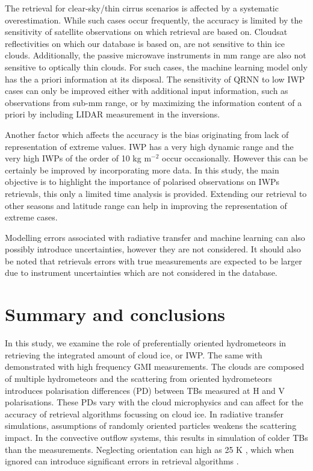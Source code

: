 \documentclass[amt, manuscript]{copernicus}
\begin{document}
The retrieval for clear-sky/thin cirrus scenarios is affected by a systematic overestimation. While such cases occur frequently, the accuracy is limited by the sensitivity of satellite observations on which retrieval are based on. Cloudsat reflectivities on which our database is based on, are not sensitive to thin ice clouds. Additionally, the passive microwave instruments in mm range are also not sensitive to optically thin clouds. For such cases, the machine learning model only has the a priori information at its disposal. The sensitivity of QRNN to low IWP cases can only be improved either with additional input information, such as observations from sub-mm range, or by maximizing the information content of a priori by including LIDAR measurement in the inversions.

Another factor which affects the accuracy is the bias originating from lack of representation of extreme values. IWP has a very high dynamic range and the very high IWPs of the order of 10\,\,kg m$^{-2}$ occur occasionally. However this can be certainly be improved by incorporating more data. In this study, the main objective is to highlight the importance of polarised observations on IWPs retrievals, this only a limited time analysis is provided. Extending our retrieval to other seasons and latitude range can help in improving the representation of extreme cases. 

Modelling errors associated with radiative transfer and machine learning can also possibly introduce uncertainties, however they are not considered. It should also be noted that retrievals errors with true measurements are expected to be larger due to instrument uncertainties which are not considered in the database. 


\section{Summary and conclusions}
%
\label{sec:conclusions}

In this study, we examine the role of preferentially oriented hydrometeors in retrieving the integrated amount of cloud ice, or IWP. The same with demonstrated with high frequency GMI measurements. The clouds are composed of multiple hydrometeors and the scattering from oriented hydrometeors introduces polarisation differences (PD) between TBs measured at H and V polarisations. These PDs vary with the cloud microphysics and can affect for the accuracy of retrieval algorithms focussing on cloud ice. In radiative transfer simulations, assumptions of randomly oriented particles weakens the scattering impact. In the convective outflow systems, this results in simulation of colder TBs than the measurements. Neglecting orientation can  high as 25\,\,K , which when ignored can introduce significant errors in retrieval algorithms .
\end{document}
